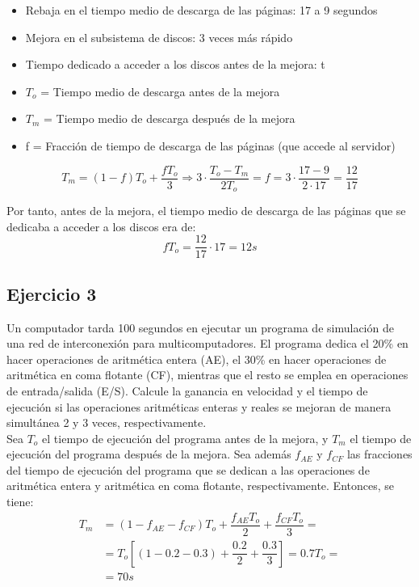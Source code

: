 \begin{itemize}
    \item Rebaja en el tiempo medio de descarga de las páginas: 17 a 9 segundos
    \item Mejora en el subsistema de discos: 3 veces más rápido
    \item Tiempo dedicado a acceder a los discos antes de la mejora: t
    \item $T_o$ = Tiempo medio de descarga antes de la mejora
    \item $T_m$ = Tiempo medio de descarga después de la mejora
    \item f = Fracción de tiempo de descarga de las páginas (que accede al servidor)
\end{itemize}

\begin{equation*}
    T_m = (1-f)T_o + \dfrac{fT_o}{3}\Longrightarrow
    3\cdot \dfrac{T_o-T_m}{2T_o} = f = 3\cdot \dfrac{17-9}{2\cdot 17} = \dfrac{12}{17}
\end{equation*}

Por tanto, antes de la mejora, el tiempo medio de descarga de las páginas que se dedicaba a acceder a los discos era de:
\begin{equation*}
    fT_o = \dfrac{12}{17}\cdot 17 = 12 s
\end{equation*}

\subsection*{Ejercicio 3}

Un computador tarda 100 segundos en ejecutar un programa de simulación de una red de interconexión para multicomputadores. El programa dedica el 20\% en hacer operaciones de aritmética entera (AE), el 30\% en hacer operaciones de aritmética en coma flotante (CF), mientras que el resto se emplea en operaciones de entrada/salida (E/S). Calcule la ganancia en velocidad y el tiempo de ejecución si las operaciones aritméticas enteras y reales se mejoran de manera simultánea 2 y 3 veces, respectivamente.\\

Sea $T_o$ el tiempo de ejecución del programa antes de la mejora, y $T_m$ el tiempo de ejecución del programa después de la mejora. Sea además $f_{AE}$ y $f_{CF}$ las fracciones del tiempo de ejecución del programa que se dedican a las operaciones de aritmética entera y aritmética en coma flotante, respectivamente. Entonces, se tiene:
\begin{align*}
    T_m &= (1-f_{AE}-f_{CF})T_o + \dfrac{f_{AE}T_o}{2} + \dfrac{f_{CF}T_o}{3}
    =\\&= T_o\left[(1-0.2-0.3) + \dfrac{0.2}{2} + \dfrac{0.3}{3}\right]
    = 0.7T_o
    =\\&= 70 s
\end{align*}

